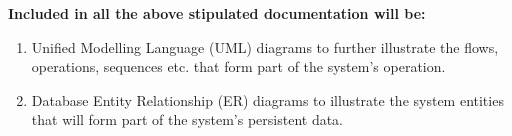 \textbf{Included in all the above stipulated documentation will be:}
\begin{enumerate}
\item Unified Modelling Language (UML) diagrams to further illustrate the
flows, operations, sequences etc. that form part of the system's
operation.
\item Database Entity Relationship (ER) diagrams to illustrate the system entities that will form part of the system's persistent data.
\end{enumerate}
